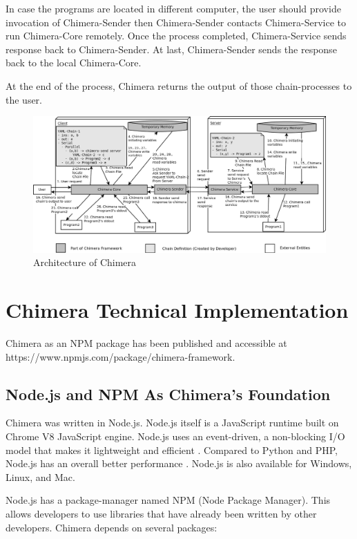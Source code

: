 \documentclass[conference]{IEEEtran}
\begin{document}
In case the programs are located in different computer, the user should provide
invocation of Chimera-Sender then Chimera-Sender contacts Chimera-Service to run 
Chimera-Core remotely. Once the process completed, Chimera-Service sends 
response back to Chimera-Sender. At last, Chimera-Sender sends the response back to
the local Chimera-Core.

At the end of the process, Chimera returns the output of those chain-processes to 
the user.

\begin{figure}
	\centering
	\includegraphics[width=1.0\textwidth]
		{images/chimera.png}
	\caption{Architecture of Chimera}
	\label{fig:chimeraArchitecture}
\end{figure}

\section{Chimera Technical Implementation}

Chimera as an NPM package has been published and accessible at 
https://www.npmjs.com/package/chimera-framework.


\subsection{Node.js and NPM As Chimera's Foundation}

Chimera was written in Node.js. Node.js itself is a JavaScript runtime built on Chrome 
V8 JavaScript engine. Node.js uses an event-driven, a non-blocking I/O model that makes it 
lightweight and efficient \cite{nodejs}. Compared to Python and PHP, Node.js has an 
overall better performance \cite{lei2014performance}. Node.js is also available for
Windows, Linux, and Mac.

Node.js has a package-manager named NPM (Node Package Manager). This allows developers
to use libraries that have already been written by other developers. Chimera depends on 
several packages:
\end{document}

